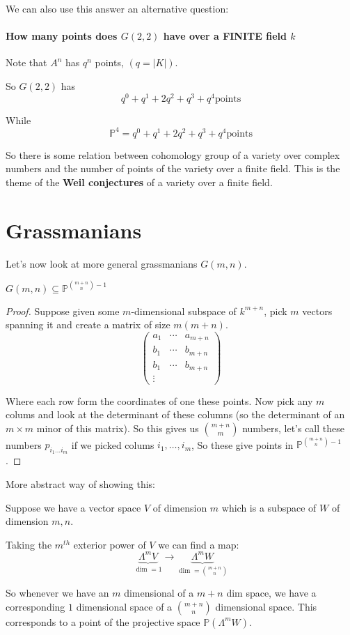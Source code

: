 We can also use this answer an alternative question:

\paragraph*{How many points does $G(2,2)$ have over a FINITE field $k$}

Note that $A^n$ has $q^n$ points, $(q = |K|)$.

So $G(2,2)$ has \[q^0+q^1+2q^2+q^3+q^4 \text{points}\]

While \[\mathbb{P}^4 = q^0+q^1+2q^2+q^3+q^4 \text{points}\]

So there is some relation between cohomology group of a variety over complex numbers and the number of points of the variety over a finite field. This is the theme of the \textbf{Weil conjectures} of a variety over a finite field. 

\section{Grassmanians}
Let's now look at more general grassmanians $G(m,n)$. 

\begin{theorem}
    $G(m,n)\subseteq \mathbb{P}^{\binom{m+n}{n}-1}$
\begin{proof}
    Suppose given some $m$-dimensional subspace of $k^{m+n}$, pick $m$ vectors spanning it and create a matrix of size $m(m+n)$. \[\begin{pmatrix}
        a_1 &\cdots& a_{m+n}\\
        b_1 &\cdots& b_{m+n}\\
        b_1 &\cdots& b_{m+n}\\
        \vdots
    \end{pmatrix}\]

Where each row form the coordinates of one these points. Now pick any $m$ colums and look at the determinant of these columns (so the determinant of an $m\times m$ minor of this matrix). So this gives us $\binom{m+n}{m}$ numbers, let's call these numbers $p_{i_1\dots i_m}$ if we picked colums $i_1,\dots,i_m$, So these give points in $\mathbb{P}^{\binom{m+n}{n}-1}$. 
\end{proof}

\begin{remark}
More abstract way of showing this:

Suppose we have a vector space $V$ of dimension $m$ which is a subspace of $W$ of dimension $m,n$. 

Taking the $m^{th}$ exterior power of $V$ we can find a map:\[\underbrace{\Lambda^m V}_{\dim = 1} \rightarrow \underbrace{\Lambda^m W}_{\dim = \binom{m+n}{n}}\]

So whenever we have an $m$ dimensional of a $m+n$ dim space, we have a corresponding $1$ dimensional space of a $\binom{m+n}{n}$ dimensional space. This corresponds to a point of the projective space $\mathbb{P}(\Lambda^m W)$.
\end{remark}
\end{theorem}

